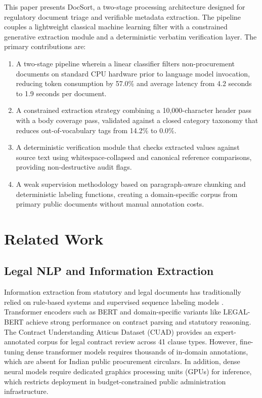 \documentclass[conference]{IEEEtran}
\begin{document}
This paper presents DocSort, a two-stage processing architecture designed for regulatory document triage and verifiable metadata extraction. The pipeline couples a lightweight classical machine learning filter with a constrained generative extraction module and a deterministic verbatim verification layer. The primary contributions are:
\begin{enumerate}
    \item A two-stage pipeline wherein a linear classifier filters non-procurement documents on standard CPU hardware prior to language model invocation, reducing token consumption by 57.0\% and average latency from 4.2 seconds to 1.9 seconds per document.
    \item A constrained extraction strategy combining a 10,000-character header pass with a body coverage pass, validated against a closed category taxonomy that reduces out-of-vocabulary tags from 14.2\% to 0.0\%.
    \item A deterministic verification module that checks extracted values against source text using whitespace-collapsed and canonical reference comparisons, providing non-destructive audit flags.
    \item A weak supervision methodology based on paragraph-aware chunking and deterministic labeling functions, creating a domain-specific corpus from primary public documents without manual annotation costs.
\end{enumerate}

\section{Related Work}

\subsection{Legal NLP and Information Extraction}
Information extraction from statutory and legal documents has traditionally relied on rule-based systems and supervised sequence labeling models \cite{zhong2020does}. Transformer encoders such as BERT \cite{devlin2018bert} and domain-specific variants like LEGAL-BERT \cite{chalkidis2020legalbert} achieve strong performance on contract parsing and statutory reasoning. The Contract Understanding Atticus Dataset (CUAD) \cite{hendrycks2021cuad} provides an expert-annotated corpus for legal contract review across 41 clause types. However, fine-tuning dense transformer models requires thousands of in-domain annotations, which are absent for Indian public procurement circulars. In addition, dense neural models require dedicated graphics processing units (GPUs) for inference, which restricts deployment in budget-constrained public administration infrastructure.
\end{document}
